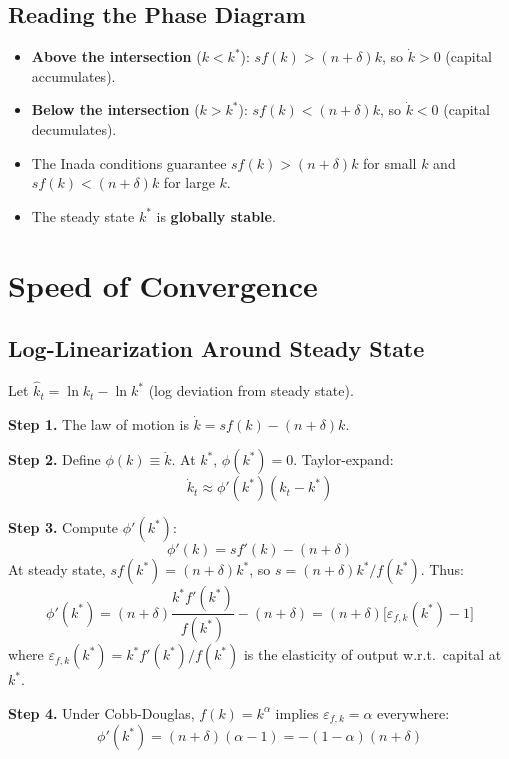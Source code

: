 \documentclass[a4paper,11pt]{article}
\begin{document}
\subsection*{Reading the Phase Diagram}

\begin{itemize}
    \item \textbf{Above the intersection} ($k < k^*$): $sf(k) > (n+\delta)k$, so $\dot{k} > 0$ (capital accumulates).
    \item \textbf{Below the intersection} ($k > k^*$): $sf(k) < (n+\delta)k$, so $\dot{k} < 0$ (capital decumulates).
    \item The Inada conditions guarantee $sf(k) > (n+\delta)k$ for small $k$ and $sf(k) < (n+\delta)k$ for large $k$.
    \item The steady state $k^*$ is \textbf{globally stable}.
\end{itemize}

\section{Speed of Convergence}

\subsection*{Log-Linearization Around Steady State}

\begin{derivationbox}
Let $\hat{k}_t = \ln k_t - \ln k^*$ (log deviation from steady state).

\textbf{Step 1.} The law of motion is $\dot{k} = sf(k) - (n+\delta)k$.

\textbf{Step 2.} Define $\phi(k) \equiv \dot{k}$. At $k^*$, $\phi(k^*) = 0$. Taylor-expand:
\[
\dot{k}_t \approx \phi'(k^*)(k_t - k^*)
\]

\textbf{Step 3.} Compute $\phi'(k^*)$:
\[
\phi'(k) = sf'(k) - (n+\delta)
\]
At steady state, $sf(k^*) = (n+\delta)k^*$, so $s = (n+\delta)k^*/f(k^*)$. Thus:
\[
\phi'(k^*) = (n+\delta)\frac{k^* f'(k^*)}{f(k^*)} - (n+\delta) = (n+\delta)\bigl[\varepsilon_{f,k}(k^*) - 1\bigr]
\]
where $\varepsilon_{f,k}(k^*) = k^* f'(k^*)/f(k^*)$ is the elasticity of output w.r.t.\ capital at $k^*$.

\textbf{Step 4.} Under Cobb-Douglas, $f(k) = k^\alpha$ implies $\varepsilon_{f,k} = \alpha$ everywhere:
\[
\phi'(k^*) = (n+\delta)(\alpha - 1) = -(1-\alpha)(n+\delta)
\]
\end{derivationbox}
\end{document}
